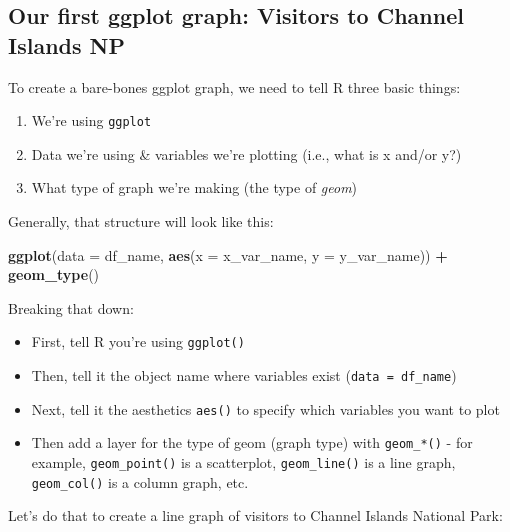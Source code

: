 \documentclass[]{book}
\newenvironment{Shaded}{\begin{snugshade}}{\end{snugshade}}
\newcommand{\DataTypeTok}[1]{\textcolor[rgb]{0.13,0.29,0.53}{#1}}
\newcommand{\KeywordTok}[1]{\textcolor[rgb]{0.13,0.29,0.53}{\textbf{#1}}}
\newcommand{\NormalTok}[1]{#1}
\newcommand{\OperatorTok}[1]{\textcolor[rgb]{0.81,0.36,0.00}{\textbf{#1}}}
\newcommand{\StringTok}[1]{\textcolor[rgb]{0.31,0.60,0.02}{#1}}
\providecommand{\tightlist}{%
  \setlength{\itemsep}{0pt}\setlength{\parskip}{0pt}}
\begin{document}
\hypertarget{our-first-ggplot-graph-visitors-to-channel-islands-np}{%
\subsection{Our first ggplot graph: Visitors to Channel Islands NP}\label{our-first-ggplot-graph-visitors-to-channel-islands-np}}

To create a bare-bones ggplot graph, we need to tell R three basic things:

\begin{enumerate}
\def\labelenumi{\arabic{enumi}.}
\tightlist
\item
  We're using \texttt{ggplot}
\item
  Data we're using \& variables we're plotting (i.e., what is x and/or y?)
\item
  What type of graph we're making (the type of \emph{geom})
\end{enumerate}

Generally, that structure will look like this:

\begin{Shaded}
\begin{Highlighting}[]
\KeywordTok{ggplot}\NormalTok{(}\DataTypeTok{data =}\NormalTok{ df_name, }\KeywordTok{aes}\NormalTok{(}\DataTypeTok{x =}\NormalTok{ x_var_name, }\DataTypeTok{y =}\NormalTok{ y_var_name)) }\OperatorTok{+}
\StringTok{  }\KeywordTok{geom_type}\NormalTok{()}
\end{Highlighting}
\end{Shaded}

Breaking that down:

\begin{itemize}
\tightlist
\item
  First, tell R you're using \texttt{ggplot()}
\item
  Then, tell it the object name where variables exist (\texttt{data\ =\ df\_name})
\item
  Next, tell it the aesthetics \texttt{aes()} to specify which variables you want to plot
\item
  Then add a layer for the type of geom (graph type) with \texttt{geom\_*()} - for example, \texttt{geom\_point()} is a scatterplot, \texttt{geom\_line()} is a line graph, \texttt{geom\_col()} is a column graph, etc.
\end{itemize}

Let's do that to create a line graph of visitors to Channel Islands National Park:
\end{document}
